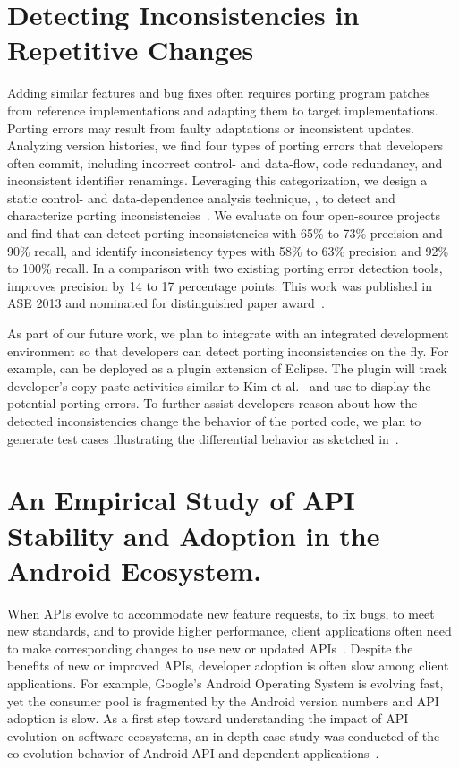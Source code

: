 \documentclass[a4paper, 11pt]{article}
\begin{document}
\begin{small}
\section*{\small Detecting Inconsistencies in  Repetitive Changes}

Adding similar features and bug fixes often requires porting program patches from reference implementations and adapting them to target
implementations. Porting errors may result from faulty adaptations or inconsistent updates. 
Analyzing version histories, we find four types of porting errors that developers often commit, including incorrect control- and
data-flow, code redundancy, and inconsistent identifier renamings. Leveraging this categorization, we design a static control- and
data-dependence analysis technique, {\spa}, to detect and characterize porting inconsistencies~\cite{ray2013detecting}. 
We evaluate {\spa} on four open-source projects and find that {\spa} can detect porting inconsistencies with
65\% to 73\% precision and 90\% recall, and identify inconsistency types with 58\% to 63\% precision and 92\% to 100\% recall. 
In a comparison with two existing porting error detection tools, {\spa} improves precision by 14 to 17 percentage points.
This work was published in ASE 2013 and nominated for distinguished paper award~\cite{ray2013detecting}.

As part of our future work, we plan to integrate {\spa} with an integrated development environment so
 that developers can detect porting inconsistencies on the fly. For example, {\spa} can be deployed as a plugin extension of Eclipse. The plugin will track developer's copy-paste activities similar to Kim et al.~\cite{Kim2004} and use {\spa} to display the potential porting errors. To further assist developers reason about how the detected inconsistencies change the behavior of the ported code, we plan to generate test cases illustrating the differential behavior as sketched in~\cite{rayThesis}.

\section*{\small An Empirical Study of API Stability and Adoption in the Android Ecosystem.}

When APIs evolve to accommodate new feature requests, to fix bugs, to meet new standards, and to provide higher performance, 
client applications often need to make corresponding changes to use new or updated APIs~\cite{Al-Ekram2005:byaccident}. 
Despite the benefits of new or improved APIs, developer adoption is often slow among client applications. 
For example, Google's Android Operating System is evolving fast, yet the consumer pool is fragmented by the Android 
version numbers and API adoption is slow. As a first step toward understanding the impact of API evolution on software ecosystems, 
an in-depth case study was conducted of the co-evolution behavior of Android API and dependent applications~\cite{mcdonnell2013empirical}. 


\end{small}
\end{document}
